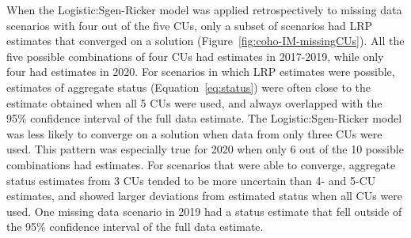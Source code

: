 \documentclass[11pt]{book}
\begin{document}
When the Logistic:Sgen-Ricker model was applied retrospectively to missing data scenarios with four out of the five CUs, only a subset of scenarios had LRP estimates that converged on a solution (Figure~\ref{fig:coho-IM-missingCUs}). All the five possible combinations of four CUs had estimates in 2017-2019, while only four had estimates in 2020. For scenarios in which LRP estimates were possible, estimates of aggregate status (Equation~\ref{eq:status}) were often close to the estimate obtained when all 5 CUs were used, and always overlapped with the 95\% confidence interval of the full data estimate. The Logistic:Sgen-Ricker model was less likely to converge on a solution when data from only three CUs were used. This pattern was especially true for 2020 when only 6 out of the 10 possible combinations had estimates. For scenarios that were able to converge, aggregate status estimates from 3 CUs tended to be more uncertain than 4- and 5-CU estimates, and showed larger deviations from estimated status when all CUs were used. One missing data scenario in 2019 had a status estimate that fell outside of the 95\% confidence interval of the full data estimate.
\end{document}
